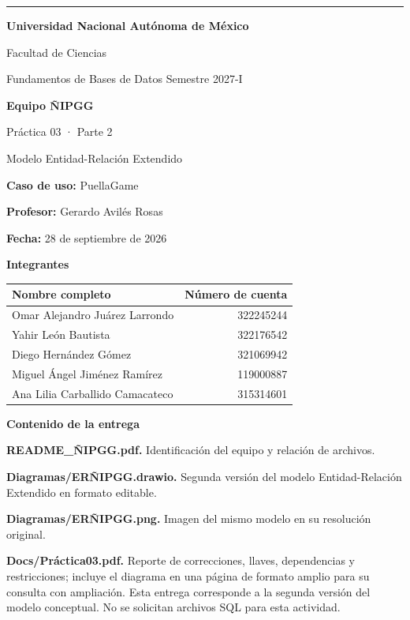 \documentclass[11pt,letterpaper]{article}
\begin{document}
{\color{oro}\rule{\textwidth}{2pt}}
\vspace{.4cm}
{\Large\color{azul}\bfseries Universidad Nacional Autónoma de México}\par
Facultad de Ciencias\par
Fundamentos de Bases de Datos \hfill Semestre 2027-I
\vspace{.7cm}

{\Huge\color{azul}\bfseries Equipo ÑIPGG}\par
{\Large Práctica 03 · Parte 2}\par
Modelo Entidad-Relación Extendido\par
\textbf{Caso de uso:} PuellaGame\par
\textbf{Profesor:} Gerardo Avilés Rosas\par
\textbf{Fecha:} 28 de septiembre de 2026
\vspace{.4cm}

{\large\color{azul}\bfseries Integrantes}\par
\begin{tabularx}{\textwidth}{@{}Xr@{}}
\toprule
\textbf{Nombre completo} & \textbf{Número de cuenta}\\\midrule
Omar Alejandro Juárez Larrondo & 322245244\\
Yahir León Bautista & 322176542\\
Diego Hernández Gómez & 321069942\\
Miguel Ángel Jiménez Ramírez & 119000887\\
Ana Lilia Carballido Camacateco & 315314601\\\bottomrule
\end{tabularx}
\vspace{.5cm}

{\large\color{azul}\bfseries Contenido de la entrega}\par
\textbf{README\_ÑIPGG.pdf.} Identificación del equipo y relación de archivos.\par
\textbf{Diagramas/ERÑIPGG.drawio.} Segunda versión del modelo Entidad-Relación Extendido en formato editable.\par
\textbf{Diagramas/ERÑIPGG.png.} Imagen del mismo modelo en su resolución original.\par
\textbf{Docs/Práctica03.pdf.} Reporte de correcciones, llaves, dependencias y restricciones; incluye el diagrama en una página de formato amplio para su consulta con ampliación.
\vfill
{\small\color{azul}Esta entrega corresponde a la segunda versión del modelo conceptual. No se solicitan archivos SQL para esta actividad.}
\end{document}
